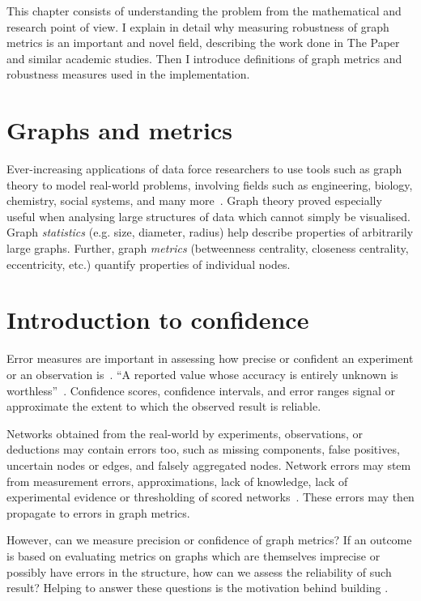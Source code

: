 This chapter consists of understanding the problem from the mathematical and research point of view.
I explain in detail why measuring robustness of graph metrics is an important and novel field, describing the work done in The Paper and similar academic studies.
Then I introduce definitions of graph metrics and robustness measures used in the implementation.


\section{Graphs and metrics}

Ever-increasing applications of data force researchers to use tools such as graph theory to model real-world problems, involving fields such as engineering, biology, chemistry, social systems, and many more~\cite{FouldsGraphTheoryApplications2012}.
Graph theory proved especially useful when analysing large structures of data which cannot simply be visualised.
Graph \textsl{statistics} (e.g. size, diameter, radius) help describe properties of arbitrarily large graphs.
Further, graph \textsl{metrics} (betweenness centrality, closeness centrality, eccentricity, etc.) quantify properties of individual nodes.


\section{Introduction to confidence}

Error measures are important in assessing how precise or confident an experiment or an observation is~\cite{Curran-EverettExplorationsStatisticsStandard2008}.
\enquote{A reported value whose accuracy is entirely unknown is worthless}~\cite{EisenhartExpressionUncertaintiesFinal1968}.
Confidence scores, confidence intervals, and error ranges signal or approximate the extent to which the observed result is reliable.

Networks obtained from the real-world by experiments, observations, or deductions may contain errors too, such as missing components, false positives, uncertain nodes or edges, and falsely aggregated nodes.
Network errors may stem from measurement errors, approximations, lack of knowledge, lack of experimental evidence or thresholding of scored networks~\cite{Wang2012,MarsdenNetworkDataMeasurement1990,JonesChallengesLimitationsQuantifying2010}.
These errors may then propagate to errors in graph metrics.

However, can we measure precision or confidence of graph metrics?
If an outcome is based on evaluating metrics on graphs which are themselves imprecise or possibly have errors in the structure, how can we assess the reliability of such result?
Helping to answer these questions is the motivation behind building \graffs.

